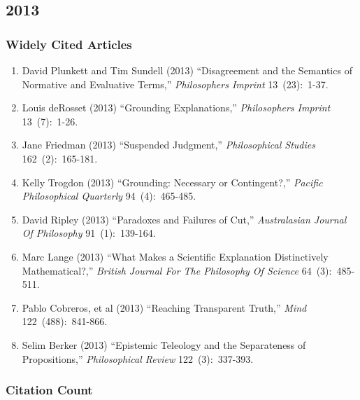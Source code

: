 \documentclass[
  10pt,
  letterpaper,
  DIV=11,
  numbers=noendperiod,
  twoside]{scrartcl}
\providecommand{\tightlist}{%
  \setlength{\itemsep}{0pt}\setlength{\parskip}{0pt}}\usepackage{longtable,booktabs,array}
\begin{document}
\newpage

\subsection{2013}\label{sec-s2013}

\subsubsection*{Widely Cited Articles}\label{widely-cited-articles-57}

\begin{enumerate}
\def\labelenumi{\arabic{enumi}.}
\tightlist
\item
  David Plunkett and Tim Sundell (2013) ``Disagreement and the Semantics
  of Normative and Evaluative Terms,'' \emph{Philosophers Imprint}
  13~(23):~1-37.
\item
  Louis deRosset (2013) ``Grounding Explanations,'' \emph{Philosophers
  Imprint} 13~(7):~1-26.
\item
  Jane Friedman (2013) ``Suspended Judgment,'' \emph{Philosophical
  Studies} 162~(2):~165-181.
\item
  Kelly Trogdon (2013) ``Grounding: Necessary or Contingent?,''
  \emph{Pacific Philosophical Quarterly} 94~(4):~465-485.
\item
  David Ripley (2013) ``Paradoxes and Failures of Cut,''
  \emph{Australasian Journal Of Philosophy} 91~(1):~139-164.
\item
  Marc Lange (2013) ``What Makes a Scientific Explanation Distinctively
  Mathematical?,'' \emph{British Journal For The Philosophy Of Science}
  64~(3):~485-511.
\item
  Pablo Cobreros, et al (2013) ``Reaching Transparent Truth,''
  \emph{Mind} 122~(488):~841-866.
\item
  Selim Berker (2013) ``Epistemic Teleology and the Separateness of
  Propositions,'' \emph{Philosophical Review} 122~(3):~337-393.
\end{enumerate}

\subsubsection*{Citation Count}\label{sec-count-2013}
\end{document}
